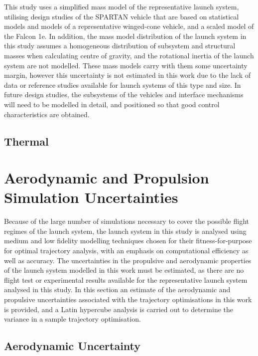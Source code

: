 This study uses a simplified mass model of the representative launch system, utilising design studies of the SPARTAN vehicle\cite{Preller2017b} that are based on statistical models and models of a representative winged-cone vehicle\cite{Preller2018}, and a scaled model of the Falcon 1e\cite{Vehicle2008}. In addition, the mass model distribution of the launch system in this study assumes a homogeneous distribution of subsystem and structural masses when calculating centre of gravity, and the rotational inertia of the launch system are not modelled.
These mass models carry with them some uncertainty margin, however this uncertainty is not estimated in this work due to the lack of data or reference studies available for launch systems of this type and size. 
In future design studies, the subsystems of the vehicles and interface mechanisms will need to be modelled in detail, and positioned so that good control characteristics are obtained. 



\subsection{Thermal}




\section{Aerodynamic and Propulsion Simulation Uncertainties}


Because of the large number of simulations necessary to cover the possible flight regimes of the launch system, the launch system in this study is analysed using medium and low fidelity modelling techniques chosen for their fitness-for-purpose for optimal trajectory analysis, with an emphasis on computational efficiency as well as accuracy.
The uncertainties in the propulsive and aerodynamic properties of the launch system modelled in this work must be estimated, as there are no flight test or experimental results available for the representative launch system analysed in this study. In this section an estimate of the aerodynamic and propulsive uncertainties associated with the trajectory optimisations in this work is provided, and a Latin hypercube analysis is carried out to determine the variance in a sample trajectory optimisation. 

\subsection{Aerodynamic Uncertainty}




